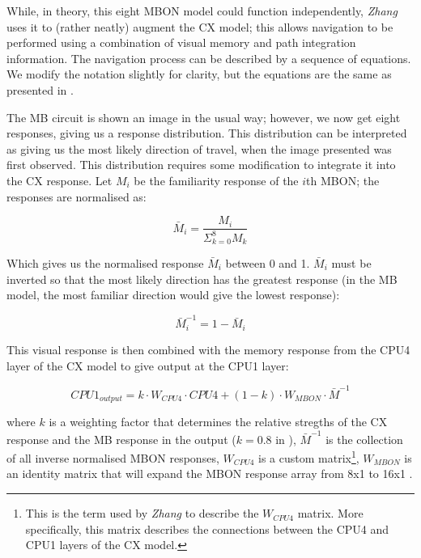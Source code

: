 \documentclass[a4paper,11pt,twoside,openright]{article}
\begin{document}
While, in theory, this eight MBON model could function independently,
\textit{Zhang} uses it to (rather neatly) augment the CX model; this allows
navigation to be performed using a combination of visual memory and path
integration information. The navigation process can be described by a sequence
of equations. We modify the notation slightly for clarity, but the
equations are the same as presented in \cite{Zhang2017}.
\newline
\par

The MB circuit is shown an image in the usual way; however, we now
get eight responses, giving us a response distribution. This distribution can
be interpreted as giving us the most likely direction of travel, when the image
presented was first observed. This distribution requires some modification to
integrate it into the CX response. Let $M_i$ be the familiarity response of the
$i$th MBON; the responses are normalised as:

\begin{equation}
  \bar{M}_i = \frac{M_i}{\Sigma^{8}_{k = 0} M_k}
\end{equation}

Which gives us the normalised response $\bar{M}_i$ between 0 and 1. $\bar{M}_i$
must be inverted so that the most likely direction has the greatest response
(in the MB model, the most familiar direction would give the lowest response):

\begin{equation}
  \bar{M}^{-1}_i = 1 - \bar{M}_i
\end{equation}

This visual response is then combined with the memory response from the CPU4
layer of the CX model to give output at the CPU1 layer:

\begin{equation}
  CPU1_{output} = k \cdot W_{CPU4} \cdot CPU4 + (1 - k) \cdot W_{MBON} \cdot
  \bar{M}^{-1}
\end{equation}

where $k$ is a weighting factor that determines the relative stregths of the CX
response and the MB response in the output ($k = 0.8$ in \cite{Zhang2017}),
$\bar{M}^{-1}$ is the collection of all inverse normalised MBON responses,
$W_{CPU4}$ is a custom matrix\footnote{This is the term used by \textit{Zhang} to
  describe   the $W_{CPU4}$ matrix. More specifically, this matrix describes the
  connections between the CPU4 and CPU1 layers of the CX model.}, $W_{MBON}$ is
an identity matrix that will expand the MBON response array from 8x1 to 16x1
\cite{Zhang2017}.
\newline
\par
\end{document}
